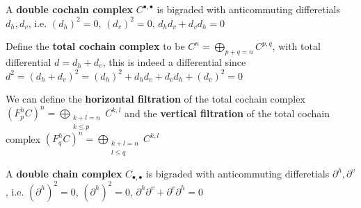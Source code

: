 \documentclass[main]{subfiles}
\begin{document}
\begin{definition}
A \textbf{double cochain complex} $C^{\bullet,\bullet}$ is bigraded with anticommuting differetials $d_h,d_v$, i.e. $(d_h)^2=0$, $(d_v)^2=0$, $d_hd_v+d_vd_h=0$
\begin{center}
\end{center}
Define the \textbf{total cochain complex} to be $\displaystyle C^n=\bigoplus_{p+q=n}C^{p,q}$, with total differential $d=d_h+d_v$, this is indeed a differential since $d^2=(d_h+d_v)^2=(d_h)^2+d_hd_v+d_vd_h+(d_v)^2=0$ \par
We can define the \textbf{horizontal filtration} of the total cochain complex $\displaystyle(F^h_pC)^n=\bigoplus_{\substack{k+l=n \\ k\leq p}}C^{k,l}$ and the \textbf{vertical filtration} of the total cochain complex $\displaystyle(F^h_qC)^n=\bigoplus_{\substack{k+l=n \\ l\leq q}}C^{k,l}$ \par
A \textbf{double chain complex} $C_{\bullet,\bullet}$ is bigraded with anticommuting differetials $\partial^h,\partial^v$, i.e. $(\partial^h)^2=0$, $(\partial^h)^2=0$, $\partial^h\partial^v+\partial^v\partial^h=0$
\begin{center}
\end{center}
\end{definition}
\end{document}
